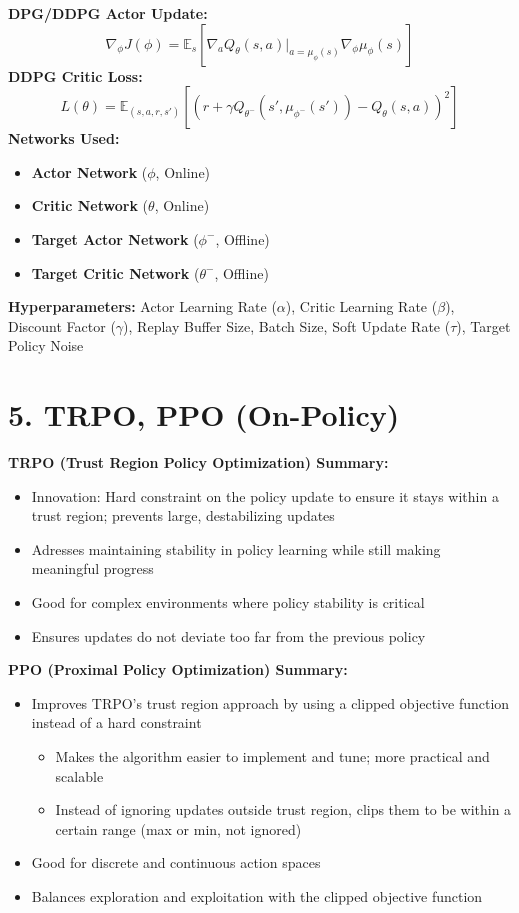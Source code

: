\documentclass[letterpaper,10pt]{article}
\begin{document}
\begin{multicols}{2}
\noindent \textbf{DPG/DDPG Actor Update:}
\[
\nabla_\phi J(\phi) = \mathbb{E}_s \left[ \nabla_a Q_\theta(s, a) \big|_{a=\mu_\phi(s)} \nabla_\phi \mu_\phi(s) \right]
\]
\textbf{DDPG Critic Loss:}
\[
L(\theta) = \mathbb{E}_{(s, a, r, s')} \left[ \left( r + \gamma Q_{\theta^-}(s', \mu_{\phi^-}(s')) - Q_\theta(s, a) \right)^2 \right]
\]
\textbf{Networks Used:}
\begin{itemize}
    \item \textbf{Actor Network} (\(\phi\), Online)
    \item \textbf{Critic Network} (\(\theta\), Online)
    \item \textbf{Target Actor Network} (\(\phi^-\), Offline)
    \item \textbf{Target Critic Network} (\(\theta^-\), Offline)
\end{itemize}
\textbf{Hyperparameters: }Actor Learning Rate (\(\alpha\)), Critic Learning Rate (\(\beta\)), Discount Factor (\(\gamma\)), Replay Buffer Size, Batch Size, Soft Update Rate (\(\tau\)), Target Policy Noise


\section*{5. TRPO, PPO (On-Policy)}
\textbf{TRPO (Trust Region Policy Optimization) Summary:}
\begin{itemize}
    \item Innovation: Hard constraint on the policy update to ensure it stays within a trust region; prevents large, destabilizing updates
    \item Adresses maintaining stability in policy learning while still making meaningful progress
    \item Good for complex environments where policy stability is critical
    \item Ensures updates do not deviate too far from the previous policy
\end{itemize}

\noindent \textbf{PPO (Proximal Policy Optimization) Summary:}
\begin{itemize}
    \item Improves TRPO's trust region approach by using a clipped objective function instead of a hard constraint
    \begin{itemize}
        \item Makes the algorithm easier to implement and tune; more practical and scalable
        \item Instead of ignoring updates outside trust region, clips them to be within a certain range (max or min, not ignored)
    \end{itemize}
    \item Good for discrete and continuous action spaces   
    \item Balances exploration and exploitation with the clipped objective function 
\end{itemize}


\end{multicols}
\end{document}
